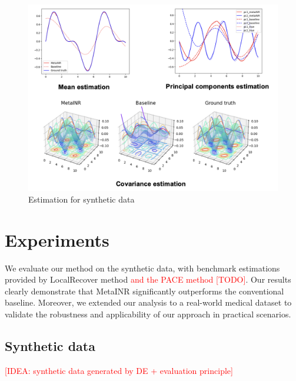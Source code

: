 \documentclass{article}
\begin{document}
\begin{figure}
  \centering
  \includegraphics[width=\textwidth]{estimation.png}
  \caption{Estimation for synthetic data}
  \label{Estimation for synthetic data}
\end{figure}



\section{Experiments}
We evaluate our method on the synthetic data, with benchmark estimations provided by LocalRecover method \textcolor{red}{and the PACE method [TODO]}.
Our results clearly demonstrate that MetaINR significantly outperforms the conventional baseline. 
Moreover, we extended our analysis to a real-world medical dataset to validate the robustness and applicability of our approach in practical scenarios.
\subsection{Synthetic data}

\textcolor{red}{[IDEA: synthetic data generated by DE + evaluation principle]}
\end{document}
